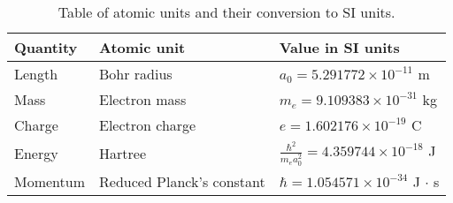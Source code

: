 \begin{table}
\centering
\begin{tabular}{@{}lll@{}}
\toprule
Quantity          & Atomic unit               & Value in SI units                                           \\ \midrule
Length            & Bohr radius               & $a_0 = 5.291772 \times 10^{-11}$ m                       \\
Mass              & Electron mass             & $m_e = 9.109383 \times 10^{-31}$ kg                      \\
Charge            & Electron charge           & $e = 1.602176 \times 10^{-19}$ C                         \\
Energy            & Hartree                   & $\frac{\hbar^2}{m_e a_0^2} = 4.359744 \times 10^{-18}$ J \\
Momentum          & Reduced Planck's constant & $\hbar = 1.054571 \times 10^{-34}$ J $\cdot$ s           \\ \bottomrule
\end{tabular}
\caption{Table of atomic units and their conversion to SI units.}
\label{t:atomic}
\end{table}
